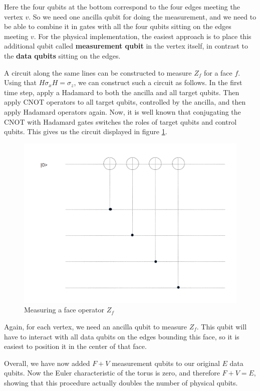 \documentclass[a4paper, draft]{article}
\theoremstyle{own}
\theoremstyle{remark}
\begin{document}
Here the four qubits at the bottom correspond to the four edges meeting the vertex $v$. So we need one ancilla qubit for doing the measurement, and we need to be able to combine it in gates with all the four qubits sitting on the edges meeting $v$. For the physical implementation, the easiest approach is to place this additional qubit called {\bf measurement qubit} in the vertex itself, in contrast to the {\bf data qubits} sitting on the edges.

A circuit along the same lines can be constructed to measure $Z_f$ for a face $f$. Using that $H \sigma_x H = \sigma_z$, we can construct such a circuit as follows. In the first time step, apply a Hadamard to both the ancilla and all target qubits. Then apply CNOT operators to all target qubits, controlled by the ancilla, and then apply Hadamard operators again. Now, it is well known that conjugating the CNOT with Hadamard gates switches the roles of target qubits and control qubits. This gives us the circuit displayed in figure \ref{fig:MeasuringZv}.


\begin{figure}
\centering
\includegraphics[width=0.7\linewidth]{images/MeasuringZv}
\caption[Measuring a face operator $Z_f$]{Measuring a face operator $Z_f$}
\label{fig:MeasuringZv}
\end{figure}

Again, for each vertex, we need an ancilla qubit to measure $Z_f$. This qubit will have to interact with all data qubits on the edges bounding this face, so it is easiest to position it in the center of that face. 

Overall, we have now added $F + V$ measurement qubits to our original $E$ data qubits. Now the Euler characteristic of the torus is zero, and therefore $F + V = E$, showing that this procedure actually doubles the number of physical qubits. 
\end{document}
